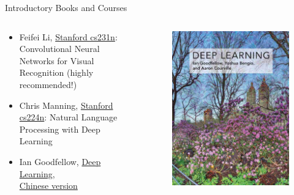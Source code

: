 \documentclass{../TexTemplate/myslide}
\begin{document}
\begin{frame}{Introductory Books and Courses}
\begin{columns}
\begin{column}{0.5\linewidth}
\begin{itemize}
\item Feifei Li, \href{http://cs231n.github.io/}{Stanford cs231n}: Convolutional Neural Networks for Visual Recognition (highly recommended!)
\item Chris Manning, \href{https://web.stanford.edu/class/archive/cs/cs224n/cs224n.1194/}{Stanford cs224n}: Natural Language Processing with Deep Learning
\item Ian Goodfellow, \href{https://www.deeplearningbook.org/}{Deep Learning},\\
\href{https://github.com/exacity/deeplearningbook-chinese}{Chinese version}
\end{itemize}
\end{column}
\begin{column}{0.5\linewidth}
\begin{figure}
\centering
\includegraphics[width=0.8\linewidth]{fig/dl_book.jpeg}
\end{figure}
\end{column}
\end{columns}
\end{frame}
\end{document}
